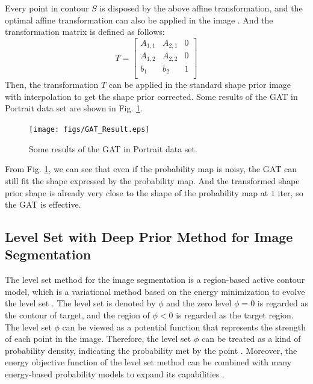 Every point in contour $S$ is disposed by the above affine transformation, and the optimal affine transformation can also be applied in the image \cite{GAT:CV:hartley2003multiple}. And the transformation matrix is defined as follows:
\begin{equation*}
    T = \begin{bmatrix}
          A_{1,1} & A_{2,1} & 0 \\
          A_{1,2} & A_{2,2} & 0 \\
          b_1 & b_2 & 1 \\
        \end{bmatrix}
\end{equation*}
Then, the transformation $T$ can be applied in the standard shape prior image with interpolation to get the shape prior corrected. Some results of the GAT in Portrait data set are shown in Fig. \ref{fig: Some results of the GAT}.
\begin{figure}[h]
    \centering
    \texttt{[image: figs/GAT\_Result.eps]}
    \caption{Some results of the GAT in Portrait data set.}
    \label{fig: Some results of the GAT}
\end{figure}
From Fig. \ref{fig: Some results of the GAT}, we can see that even if the probability map is noisy, the GAT can still fit the shape expressed by the probability map. And the transformed shape prior shape is already very close to the shape of the probability map at $1$ iter, so the GAT is effective.

\subsection{Level Set with Deep Prior Method for Image Segmentation}\label{subsec: Level Set Method for Image Segmentation}
The level set method for the image segmentation is a region-based active contour model, which is a variational method based on the energy minimization to evolve the level set \cite{LevelSet:malladi1995shape}. The level set is denoted by $\phi$ and the zero level $\phi=0$ is regarded as the contour of target, and the region of $\phi<0$ is regarded as the target region. The level set $\phi$ can be viewed as a potential function that represents the strength of each point in the image. Therefore, the level set $\phi$ can be treated as a kind of probability density, indicating the probability met by the point \cite{LevelSet:prob:cremers2008shape}. Moreover, the energy objective function of the level set method can be combined with many energy-based probability models to expand its capabilities \cite{LevelSet:prob:chen2013deep}.

